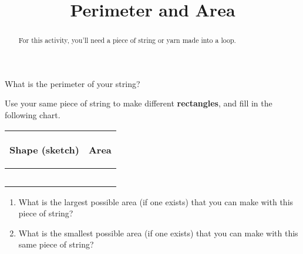 \documentclass[noauthor,nooutcomes]{ximera}
\title{Perimeter and Area}
\begin{document}
\begin{abstract} For this activity, you'll need a piece of string or yarn made into a loop. \end{abstract}
\maketitle



\begin{problem}
What is the perimeter of your string?  \end{problem}

\begin{problem} Use your same piece of string to make different {\bf rectangles}, and fill in the following chart.
\vskip 0.1in
\begin{tabular}{|p{2.2in}|p{2.2in}|}
\hline
\begin{center} Shape (sketch) \end{center} & \begin{center} Area \end{center}  \\ \hline
 & \\ [10ex] \hline
 & \\ [10 ex] \hline
 & \\ [10 ex] \hline
 & \\ [10 ex] \hline
 & \\ [10 ex] \hline
\end{tabular}
\begin{enumerate}

\item What is the largest possible area (if one exists) that you can make with this piece of string?
\item What is the smallest possible area (if one exists) that you can make with this same piece of string?
\end{enumerate}

\end{problem}
\newpage
\end{document}
